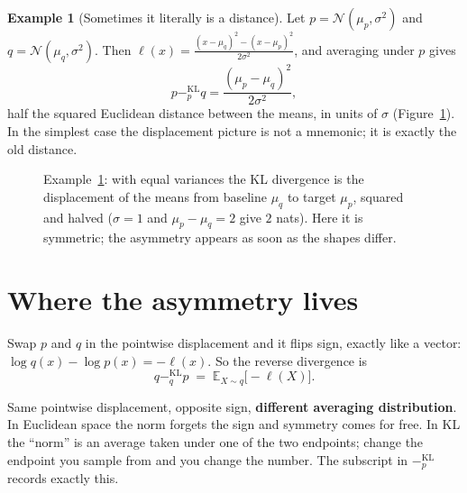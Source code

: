 \documentclass[11pt,oneside]{book}
\newcommand{\kl}[1]{\mathbin{-^{\mathrm{KL}}_{#1}}}       %
\newcommand{\E}{\mathbb{E}}
\theoremstyle{definition}
\newtheorem{example}[definition]{Example}
\theoremstyle{plain}
\theoremstyle{remark}
\begin{document}
\begin{example}[Sometimes it literally is a distance]\label{ex:equalvar}
Let $p=\mathcal N(\mu_p,\sigma^2)$ and $q=\mathcal N(\mu_q,\sigma^2)$. Then
$\ell(x)=\frac{(x-\mu_q)^2-(x-\mu_p)^2}{2\sigma^2}$, and averaging under $p$ gives
\[
p\kl{p}q=\frac{(\mu_p-\mu_q)^2}{2\sigma^2},
\]
half the squared Euclidean distance between the means, in units of $\sigma$ (Figure~\ref{fig:equalvar}). In the
simplest case the displacement picture is not a mnemonic; it is exactly the old distance.
\end{example}

\begin{figure}[t]
\centering
{}
\caption{Example~\ref{ex:equalvar}: with equal variances the KL divergence is the displacement of the means
from baseline $\mu_q$ to target $\mu_p$, squared and halved ($\sigma=1$ and $\mu_p-\mu_q=2$ give $2$ nats).
Here it is symmetric; the asymmetry appears as soon as the shapes differ.}
\label{fig:equalvar}
\end{figure}

\section{Where the asymmetry lives}

Swap $p$ and $q$ in the pointwise displacement and it flips sign, exactly like a vector:
$\log q(x)-\log p(x)=-\ell(x)$. So the reverse divergence is
\begin{equation}\label{eq:reverse}
q\kl{q}p\;=\;\E_{X\sim q}\big[-\ell(X)\big].
\end{equation}
\begin{tcolorbox}[keybox,title=Where the asymmetry comes from]
Same pointwise displacement, opposite sign, \textbf{different averaging distribution}. In Euclidean space the norm
forgets the sign and symmetry comes for free. In KL the ``norm'' is an average taken under one of the two
endpoints; change the endpoint you sample from and you change the number. The subscript in $\kl{p}$ records
exactly this.
\end{tcolorbox}
\end{document}
